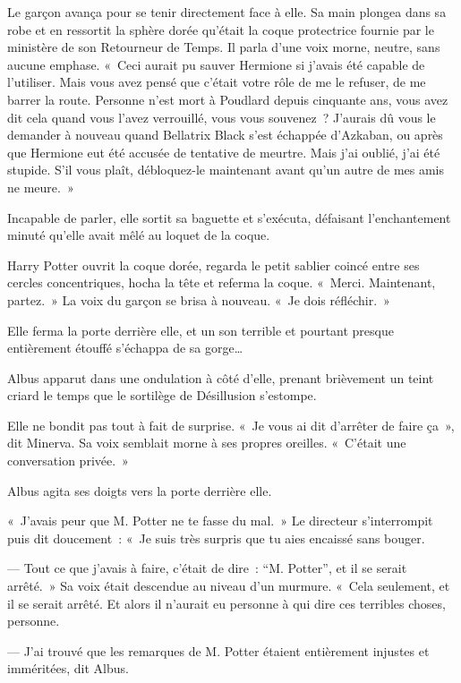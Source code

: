 Le garçon avança pour se tenir directement face à elle. Sa main plongea dans sa robe et en ressortit la sphère dorée qu'était la coque protectrice fournie par le ministère de son Retourneur de Temps. Il parla d'une voix morne, neutre, sans aucune emphase. «~Ceci aurait pu sauver Hermione si j'avais été capable de l'utiliser. Mais vous avez pensé que c'était votre rôle de me le refuser, de me barrer la route. Personne n'est mort à Poudlard depuis cinquante ans, vous avez dit cela quand vous l'avez verrouillé, vous vous souvenez~? J'aurais dû vous le demander à nouveau quand Bellatrix Black s'est échappée d'Azkaban, ou après que Hermione eut été accusée de tentative de meurtre. Mais j'ai oublié, j'ai été stupide. S'il vous plaît, débloquez-le maintenant avant qu'un autre de mes amis ne meure.~»

Incapable de parler, elle sortit sa baguette et s'exécuta, défaisant l'enchantement minuté qu'elle avait mêlé au loquet de la coque.

Harry Potter ouvrit la coque dorée, regarda le petit sablier coincé entre ses cercles concentriques, hocha la tête et referma la coque. «~Merci. Maintenant, partez.~» La voix du garçon se brisa à nouveau. «~Je dois réfléchir.~»

\later

Elle ferma la porte derrière elle, et un son terrible et pourtant presque entièrement étouffé s'échappa de sa gorge…

Albus apparut dans une ondulation à côté d'elle, prenant brièvement un teint criard le temps que le sortilège de Désillusion s'estompe.

Elle ne bondit pas tout à fait de surprise. «~Je vous ai dit d'arrêter de faire ça~», dit Minerva. Sa voix semblait morne à ses propres oreilles. «~C'était une conversation privée.~»

Albus agita ses doigts vers la porte derrière elle.

«~J'avais peur que M. Potter ne te fasse du mal.~» Le directeur s'interrompit puis dit doucement~: «~Je suis très surpris que tu aies encaissé sans bouger.

--- Tout ce que j'avais à faire, c'était de dire~: “M. Potter”, et il se serait arrêté.~» Sa voix était descendue au niveau d'un murmure. «~Cela seulement, et il se serait arrêté. Et alors il n'aurait eu personne à qui dire ces terribles choses, personne.

--- J'ai trouvé que les remarques de M. Potter étaient entièrement injustes et imméritées, dit Albus.

